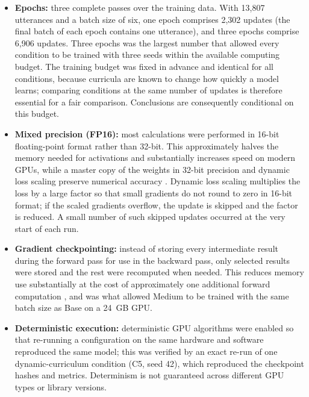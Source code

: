 \begin{itemize}
    accumulation. This was the largest batch that fitted comfortably in GPU memory
    for Base. The same batch size was retained for Medium, which fitted with a
    peak memory reservation of approximately 15~GB, so that both model sizes
    received exactly the same sequence of updates.
    \item \textbf{Epochs:} three complete passes over the training data. With
    13,807 utterances and a batch size of six, one epoch comprises 2,302 updates
    (the final batch of each epoch contains one utterance), and three epochs
    comprise 6,906 updates. Three epochs was the largest number that allowed every
    condition to be trained with three seeds within the available computing budget.
    The training budget was fixed in advance and identical for all conditions,
    because curricula are known to change how quickly a model learns; comparing
    conditions at the same number of updates is therefore essential for a fair
    comparison. Conclusions are consequently conditional on this budget.
    \item \textbf{Mixed precision (FP16):} most calculations were performed in
    16-bit floating-point format rather than 32-bit. This approximately halves the
    memory needed for activations and substantially increases speed on modern
    GPUs, while a master copy of the weights in 32-bit precision and dynamic loss
    scaling preserve numerical accuracy \citep{Micikevicius2018}. Dynamic loss
    scaling multiplies the loss by a large factor so that small gradients do not
    round to zero in 16-bit format; if the scaled gradients overflow, the update is
    skipped and the factor is reduced. A small number of such skipped updates
    occurred at the very start of each run.
    \item \textbf{Gradient checkpointing:} instead of storing every intermediate
    result during the forward pass for use in the backward pass, only selected
    results were stored and the rest were recomputed when needed. This reduces
    memory use substantially at the cost of approximately one additional forward
    computation \citep{Chen2016}, and was what allowed Medium to be trained with
    the same batch size as Base on a 24~GB GPU.
    \item \textbf{Deterministic execution:} deterministic GPU algorithms were
    enabled so that re-running a configuration on the same hardware and software
    reproduced the same model; this was verified by an exact re-run of one
    dynamic-curriculum condition (C5, seed 42), which reproduced the checkpoint
    hashes and metrics. Determinism is not guaranteed across different GPU types
    or library versions.
\end{itemize}

